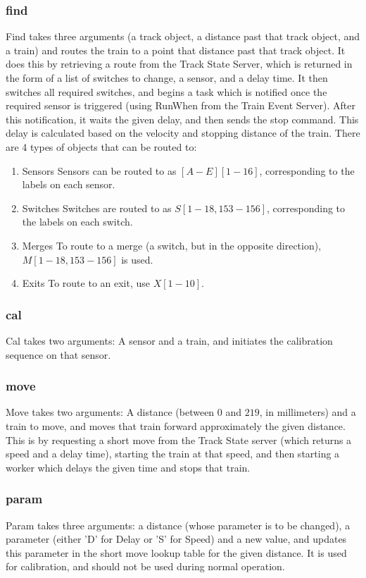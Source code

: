 \documentclass{article}
\begin{document}
\subsubsection{find}
Find takes three arguments (a track object, a distance past that track object, and a train) and routes the train to a point that distance past that track object.
It does this by retrieving a route from the Track State Server, which is returned in the form of a list of switches to change, a sensor, and a delay time. 
It then switches all required switches, and begins a task which is notified once the required sensor is triggered (using RunWhen from the Train Event Server). After this notification, it waits the given delay, and then sends the stop command. 
This delay is calculated based on the velocity and stopping distance of the train. 
There are 4 types of objects that can be routed to:
\begin{enumerate}
    \item{Sensors} Sensors can be routed to as $[A-E][1-16]$, corresponding to the labels on each sensor.
    \item{Switches} Switches are routed to as $S[1-18,153-156]$, corresponding to the labels on each switch.
    \item{Merges} To route to a merge (a switch, but in the opposite direction), $M[1-18,153-156]$ is used.
    \item{Exits} To route to an exit, use $X[1-10]$.
\end{enumerate}

\subsubsection{cal}
Cal takes two arguments: A sensor and a train, and initiates the calibration sequence on that sensor.
\subsubsection{move}
Move takes two arguments: A distance (between $0$ and $219$, in millimeters) and a train to move, and moves that train forward approximately the given distance. This is by requesting a short move from the Track State server (which returns a speed and a delay time), starting the train at that speed, and then starting a worker which delays the given time and stops that train.

\subsubsection{param}
Param takes three arguments: a distance (whose parameter is to be changed), a parameter (either 'D' for Delay or 'S' for Speed) and a new value, and updates this parameter in the short move lookup table for the given distance. It is used for calibration, and should not be used during normal operation.
\end{document}
